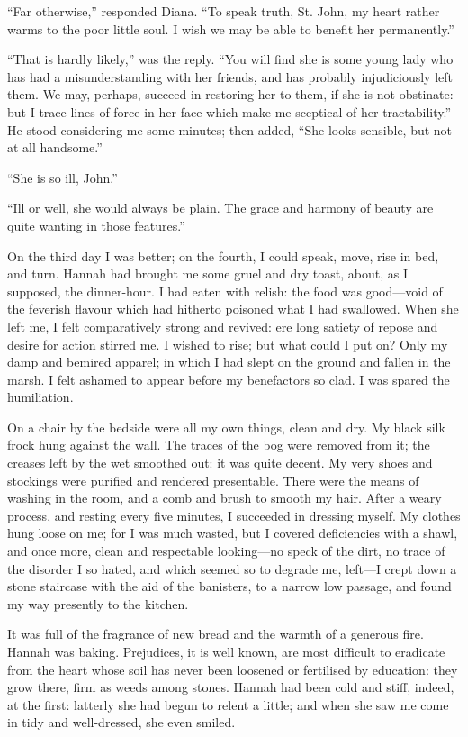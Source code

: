 \enquote{Far otherwise,} responded Diana. \enquote{To speak truth, St.
	John, my heart rather warms to the poor little soul. I wish we may be
	able to benefit her permanently.}

\enquote{That is hardly likely,} was the reply. \enquote{You will find
	she is some young lady who has had a misunderstanding with her friends,
	and has probably injudiciously left them. We may, perhaps, succeed in
	restoring her to them, if she is not obstinate: but I trace lines of
	force in her face which make me sceptical of her tractability.} He
stood considering me some minutes; then added, \enquote{She looks
	sensible, but not at all handsome.}

\enquote{She is so ill, \St{} John.}

\enquote{Ill or well, she would always be plain. The grace and harmony
	of beauty are quite wanting in those features.}

On the third day I was better; on the fourth, I could speak, move, rise
in bed, and turn. Hannah had brought me some gruel and dry toast,
about, as I supposed, the dinner-hour. I had eaten with relish: the
food was good---void of the feverish flavour which had hitherto poisoned
what I had swallowed. When she left me, I felt comparatively strong and
revived: ere long satiety of repose and desire for action stirred me. I
wished to rise; but what could I put on? Only my damp and bemired
apparel; in which I had slept on the ground and fallen in the marsh. I
felt ashamed to appear before my benefactors so clad. I was spared the
humiliation.

On a chair by the bedside were all my own things, clean and dry. My
black silk frock hung against the wall. The traces of the bog were
removed from it; the creases left by the wet smoothed out: it was quite
decent. My very shoes and stockings were purified and rendered
presentable. There were the means of washing in the room, and a comb
and brush to smooth my hair. After a weary process, and resting every
five minutes, I succeeded in dressing myself. My clothes hung loose on
me; for I was much wasted, but I covered deficiencies with a shawl, and
once more, clean and respectable looking---no speck of the dirt, no
trace of the disorder I so hated, and which seemed so to degrade me,
left---I crept down a stone staircase with the aid of the banisters, to
a narrow low passage, and found my way presently to the kitchen.

It was full of the fragrance of new bread and the warmth of a generous
fire. Hannah was baking. Prejudices, it is well known, are most
difficult to eradicate from the heart whose soil has never been loosened
or fertilised by education: they grow there, firm as weeds among
stones. Hannah had been cold and stiff, indeed, at the first: latterly
she had begun to relent a little; and when she saw me come in tidy and
well-dressed, she even smiled.

